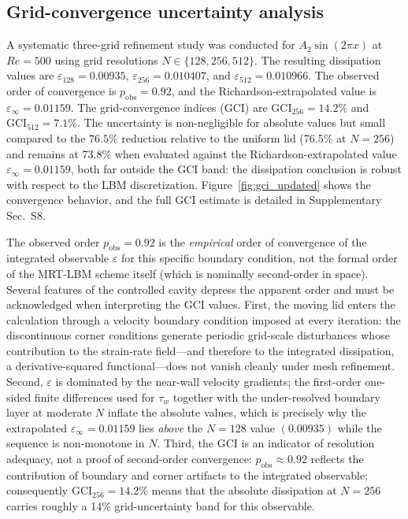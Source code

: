 \documentclass[a4paper,11pt]{article}
\begin{document}
\subsection{Grid-convergence uncertainty analysis}

A systematic three-grid refinement study was conducted for \(A_2\sin(2\pi x)\)
at \(Re=500\) using grid resolutions \(N\in\{128,256,512\}\). The resulting
dissipation values are \(\varepsilon_{128}=0.00935\), \(\varepsilon_{256}=0.010407\),
and \(\varepsilon_{512}=0.010966\). The observed order of convergence is
\(p_{\mathrm{obs}}=0.92\), and the Richardson-extrapolated value is
\(\varepsilon_\infty=0.01159\). The grid-convergence indices (GCI) are
\(\mathrm{GCI}_{256}=14.2\%\) and \(\mathrm{GCI}_{512}=7.1\%\). The uncertainty
is non-negligible for absolute values but small compared to the \(76.5\%\) reduction
relative to the uniform lid (76.5\% at \(N=256\)) and remains at 73.8\% when
evaluated against the Richardson-extrapolated value \(\varepsilon_\infty=0.01159\),
both far outside the GCI band: the dissipation conclusion is robust with respect
to the LBM discretization. Figure~\ref{fig:gci_updated} shows the convergence
behavior, and the full GCI estimate is detailed in Supplementary Sec.~S8.

The observed order \(p_{\mathrm{obs}}=0.92\) is the \emph{empirical} order of
convergence of the integrated observable \(\varepsilon\) for this specific
boundary condition, not the formal order of the MRT-LBM scheme itself (which
is nominally second-order in space). Several features of the controlled cavity
depress the apparent order and must be acknowledged when interpreting the GCI
values. First, the moving lid enters the calculation through a velocity boundary
condition imposed at every iteration: the discontinuous corner conditions generate
periodic grid-scale disturbances whose contribution to the strain-rate field---and
therefore to the integrated dissipation, a derivative-squared functional---does not
vanish cleanly under mesh refinement. Second, \(\varepsilon\) is dominated by the
near-wall velocity gradients; the first-order one-sided finite differences used
for \(\tau_w\) together with the under-resolved boundary layer at moderate \(N\)
inflate the absolute values, which is precisely why the extrapolated
\(\varepsilon_\infty=0.01159\) lies \emph{above} the \(N=128\) value \((0.00935)\)
while the sequence is non-monotone in \(N\). Third, the GCI is an indicator of
resolution adequacy, not a proof of second-order convergence:
\(p_{\mathrm{obs}}\approx0.92\) reflects the contribution of boundary and corner
artifacts to the integrated observable; consequently \(\mathrm{GCI}_{256}=14.2\%\)
means that the absolute dissipation at \(N=256\) carries roughly a 14\%
grid-uncertainty band for this observable.
\end{document}
